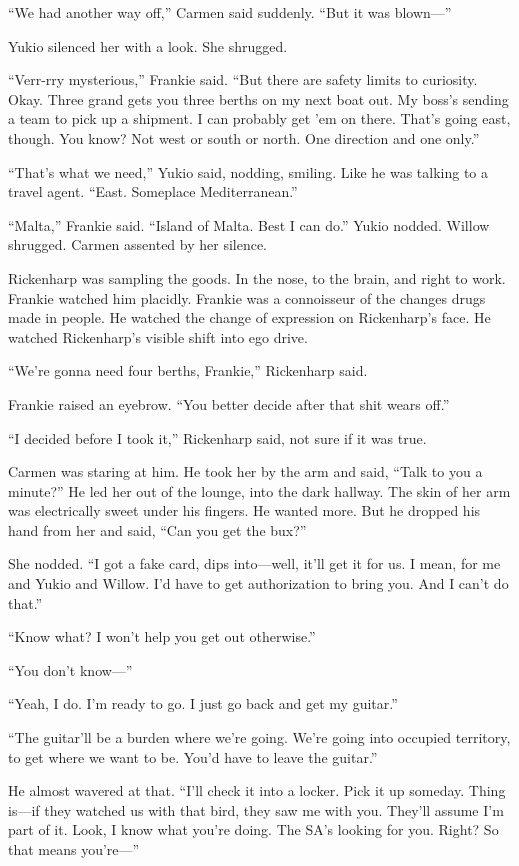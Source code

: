 ``We had another way off,'' Carmen said suddenly. ``But it was blown—''

Yukio silenced her with a look. She shrugged.

``Verr-rry mysterious,'' Frankie said. ``But there are safety limits to curiosity. Okay. Three grand gets you three berths on my next boat out. My boss's sending a team to pick up a shipment. I can probably get 'em on there. That's going east, though. You know? Not west or south or north. One direction and one only.''

``That's what we need,'' Yukio said, nodding, smiling. Like he was talking to a travel agent. ``East. Someplace Mediterranean.''

``Malta,'' Frankie said. ``Island of Malta. Best I can do.'' Yukio nodded. Willow shrugged. Carmen assented by her silence.

Rickenharp was sampling the goods. In the nose, to the brain, and right to work. Frankie watched him placidly. Frankie was a connoisseur of the changes drugs made in people. He watched the change of expression on Rickenharp's face. He watched Rickenharp's visible shift into ego drive.

``We're gonna need four berths, Frankie,'' Rickenharp said.

Frankie raised an eyebrow. ``You better decide after that shit wears off.''

``I decided before I took it,'' Rickenharp said, not sure if it was true.

Carmen was staring at him. He took her by the arm and said, ``Talk to you a minute?'' He led her out of the lounge, into the dark hallway. The skin of her arm was electrically sweet under his fingers. He wanted more. But he dropped his hand from her and said, ``Can you get the bux?''

She nodded. ``I got a fake card, dips into—well, it'll get it for us. I mean, for me and Yukio and Willow. I'd have to get authorization to bring you. And I can't do that.''

``Know what? I won't help you get out otherwise.''

``You don't know—''

``Yeah, I do. I'm ready to go. I just go back and get my guitar.''

``The guitar'll be a burden where we're going. We're going into occupied territory, to get where we want to be. You'd have to leave the guitar.''

He almost wavered at that. ``I'll check it into a locker. Pick it up someday. Thing is—if they watched us with that bird, they saw me with you. They'll assume I'm part of it. Look, I know what you're doing. The SA's looking for you. Right? So that means you're—''

